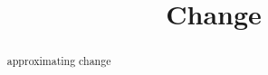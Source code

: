 \documentclass{ximera}
\title{Change}
\begin{document}
\begin{abstract}
approximating change
\end{abstract}
\maketitle
\end{document}
